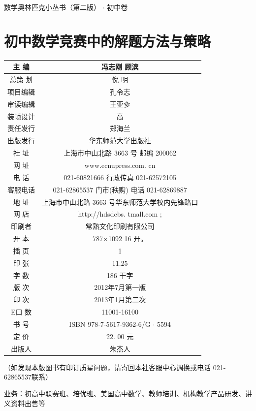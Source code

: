 \documentclass[10pt]{article}
\begin{document}
数学奥林匹克小丛书（第二版） $\cdot$ 初中卷

\section{初中数学竞赛中的解题方法与策略}
\begin{center}
\begin{tabular}{|c|c|}
\hline
主 编 & 冯志刚 顾滨 \\
\hline
总策 划 & 倪 明 \\
\hline
项目编辑 & 孔令志 \\
\hline
审读编辑 & 王亚㐱 \\
\hline
装帧设计 & 高 \\
\hline
责任发行 & 郑海兰 \\
\hline
出版发行 & 华东师范大学出版社 \\
\hline
社 址 & 上海市中山北路 3663 号 邮编 200062 \\
\hline
网 址 & www.ecnupress.com. cn \\
\hline
电 话 & 021-60821666 行政传真 021-62572105 \\
\hline
客服电话 & 021-62865537 门市(䄮购) 电话 021-62869887 \\
\hline
地 址 & 上海市中山北路 3663 号华东师范大学校内先锋路口 \\
\hline
网 店 & http://hdsdcbs. tmall.com ; \\
\hline
印刷者 & 常熟文化印刷有限公司 \\
\hline
开 本 & 787×1092 16 开。 \\
\hline
插 页 & 1 \\
\hline
印 张 & 11.25 \\
\hline
字 数 & 186 干字 \\
\hline
版 次 & 2012年7月第一版 \\
\hline
印 次 & 2013年1月第二次 \\
\hline
E口 数 & 11001-16100 \\
\hline
书 号 & ISBN 978-7-5617-9362-6/G $\cdot$ 5594 \\
\hline
定 价 & 22. 00 元 \\
\hline
出版人 & 朱杰人 \\
\hline
\end{tabular}
\end{center}

（如发现本版图书有印订质星问题，请寄回本社客服中心调换或电话 021-62865537联系）

业务：初高中联赛班、培优班、美国高中数学、教师培训、机构教学产品研发、讲义资料出售等
\end{document}
